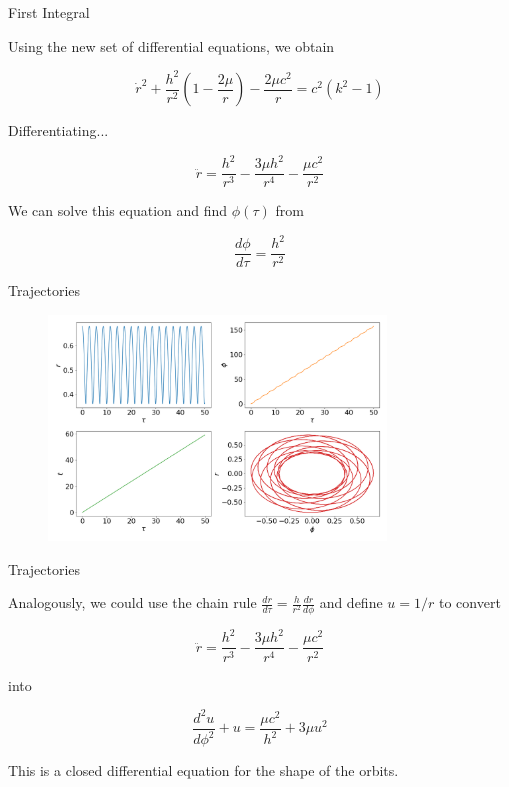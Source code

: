 \documentclass[xcolor=dvipsnames]{beamer}
\begin{document}
\begin{frame}{First Integral}
    
Using the new set of differential equations, we obtain

\begin{equation*}
\dot{r}^2 + \frac{h^2}{r^2} \left(1 - \frac{2\mu}{r} \right) - \frac{2 \mu c^2}{r} = c^2 (k^2 - 1)
\end{equation*}

Differentiating...

\begin{equation}
    \ddot{r} = \frac{h^2}{r^3} - \frac{3\mu h^2}{r^4} - \frac{\mu c^2}{r^2}
\end{equation}

We can solve this equation and find $\phi(\tau)$ from 

\begin{equation*}
    \frac{d\phi}{d\tau} = \frac{h^2}{r^2}
\end{equation*}


\end{frame}




\begin{frame}{Trajectories}

\begin{figure}[h!]
    \centering
    \includegraphics[width=0.8\textwidth]{Presentations/Images/2_first_orbits.png}
\end{figure}
    
\end{frame}




\begin{frame}{Trajectories}

Analogously, we could use the chain rule $\frac{dr}{d\tau} = \frac{h}{r^2} \frac{dr}{d\phi}$ and define $u = 1/r$ to convert 

\begin{equation*}
\ddot{r} = \frac{h^2}{r^3} - \frac{3\mu h^2}{r^4} - \frac{\mu c^2}{r^2}
\end{equation*}

into 

\begin{equation*}
    \frac{d^2 u}{d\phi^2} + u = \frac{\mu c^2}{h^2} + 3 \mu u^2
\end{equation*}

This is a closed differential equation for the shape of the orbits.

\end{frame}
\end{document}
